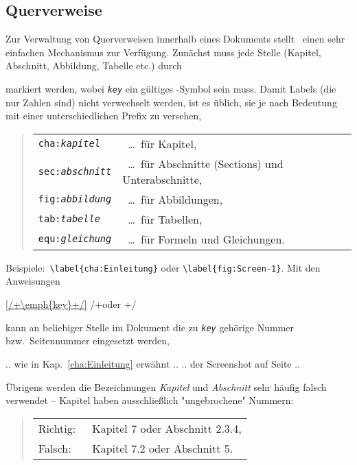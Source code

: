 \subsection{Querverweise}
\label{sec:querverweise}

Zur Verwaltung von Querverweisen innerhalb eines Dokuments stellt \latex\
einen sehr einfachen Mechanismus zur Verfügung. Zunächst muss jede Stelle
(Kapitel, Abschnitt, Abbildung, Tabelle etc.) durch
%
\begin{LaTeXCode}[numbers=none]
\label{/+\emph{key}+/}
\end{LaTeXCode}
%
markiert werden, wobei \texttt{\em key} ein gültiges \latex-Symbol sein muss.
Damit Labels (die nur Zahlen sind) nicht verwechselt werden, ist es üblich,
sie je nach Bedeutung mit einer unterschiedlichen Prefix zu versehen, \zB\
%
\begin{quote}
    \begin{tabular}{ll}
        \verb!cha:!\texttt{\em kapitel} & \ \ldots\ für Kapitel,
        \\
        \verb!sec:!\texttt{\em abschnitt} & \ \ldots\ für Abschnitte
        (Sections) und Unterabschnitte,
        \\
        \verb!fig:!\texttt{\em abbildung} & \ \ldots\ für Abbildungen,
        \\
        \verb!tab:!\texttt{\em tabelle} & \ \ldots\ für Tabellen,
        \\
        \verb!equ:!\texttt{\em gleichung} & \ \ldots\ für Formeln und
        Gleichungen.
    \end{tabular}
\end{quote}
%
\noindent
Beispiele:\ \verb!\label{cha:Einleitung}! oder \verb!\label{fig:Screen-1}!.
Mit den Anweisungen
%
\begin{LaTeXCode}[numbers=none]
\ref{/+\emph{key}+/} /+\quad oder \quad+/ 
\end{LaTeXCode}
%
kann an beliebiger Stelle im Dokument die zu \texttt{\emph{key}} gehörige
Nummer bzw.\ Seitennummer eingesetzt werden, \zB\
%
\begin{LaTeXCode}[numbers=none]
.. wie in Kap.~\ref{cha:Einleitung} erwähnt ..
.. der Screenshot auf Seite \pageref{fig:Screen-1} ..
\end{LaTeXCode}
%
Übrigens werden die Bezeichnungen \emph{Kapitel} und \emph{Abschnitt} sehr
häufig falsch verwendet -- Kapitel haben ausschließlich "ungebrochene" Nummern:
%
\begin{quote}
    \begin{tabular}{ll}
        \textrm{Richtig:\ } & Kapitel 7 oder Abschnitt 2.3.4,\\
        \textrm{Falsch:\ }  & Kapitel 7.2 oder Abschnitt 5.
    \end{tabular}
\end{quote}

